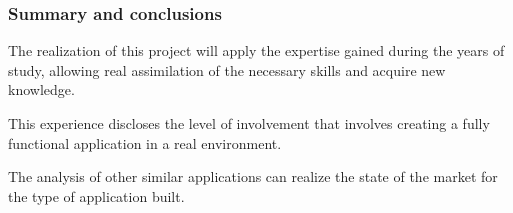 \begin{frame} [fragile]
	\frametitle{Summary and conclusions}
		The realization of this project will apply the expertise gained during the years of study, allowing real assimilation of the necessary skills and acquire new knowledge.
		
		\bigskip
		This experience discloses the level of involvement that involves creating a fully functional application in a real environment.
		
		\bigskip
		The analysis of other similar applications can realize the state of the market for the type of application built.
	\endblock{}
\end{frame}